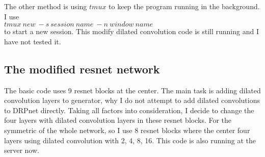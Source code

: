 \documentclass[a4paper]{article}
\begin{document}
The other method is using $tmux$ to keep the program running in the background. I use \\
$tmux~new~-s~session~name~-n~window~name$ \\
to start a new session. This modify dilated convolution code is still running and I have not tested it. 

\subsection{The modified resnet network}

The basic code uses 9 resnet blocks at the center. The main task is adding dilated convolution layers to generator, why I do not attempt to add dilated convolutions to DRPnet directly. Taking all factors into consideration, I decide to change the four layers with dilated convolution layers in these resnet blocks. For the symmetric of the whole network, so I use 8 resnet blocks where the center four layers using dilated convolution with 2, 4, 8, 16. This code is also running at the server now. 
\end{document}
